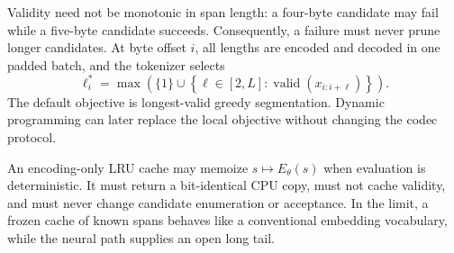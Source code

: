 \documentclass[10pt,twocolumn]{article}
\begin{document}
Validity need not be monotonic in span length: a four-byte candidate may fail while a five-byte
candidate succeeds. Consequently, a failure must never prune longer candidates. At byte offset
$i$, all lengths are encoded and decoded in one padded batch, and the tokenizer selects
\begin{equation}
\ell_i^* = \max\left(\{1\}\cup
\left\{\ell\in[2,L] : \operatorname{valid}(x_{i:i+\ell})\right\}\right).
\label{eq:segment}
\end{equation}
The default objective is longest-valid greedy segmentation. Dynamic programming can later replace
the local objective without changing the codec protocol.

An encoding-only LRU cache may memoize $s\mapsto E_\theta(s)$ when evaluation is deterministic.
It must return a bit-identical CPU copy, must not cache validity, and must never change candidate
enumeration or acceptance. In the limit, a frozen cache of known spans behaves like a conventional
embedding vocabulary, while the neural path supplies an open long tail.
\end{document}

